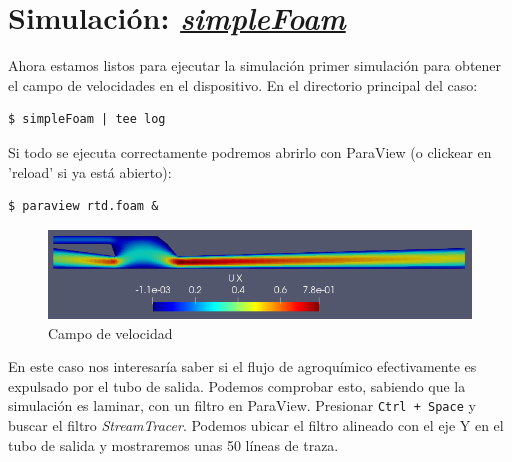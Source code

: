 \documentclass{article}
\begin{document}
%
%
%

\section{Simulación: \textit{\href{https://openfoamwiki.net/index.php/SimpleFoam}{simpleFoam}}}
Ahora estamos listos para ejecutar la simulación primer simulación para obtener el campo de velocidades en el dispositivo. En el directorio principal del caso:

\begin{lstlisting}
$ simpleFoam | tee log
\end{lstlisting}


Si todo se ejecuta correctamente podremos abrirlo con ParaView (o clickear en 'reload' si ya está abierto):
\begin{lstlisting}
$ paraview rtd.foam &
\end{lstlisting}

\begin{figure}[h!]
\centering
\includegraphics[width=1\textwidth]{Figuras/campo_vel.png}
\caption{Campo de velocidad}
\label{fig:campo_vel}
\end{figure}

En este caso nos interesaría saber si el flujo de agroquímico efectivamente es expulsado por el tubo de salida. Podemos comprobar esto, sabiendo que la simulación es laminar, con un filtro en ParaView. Presionar
\texttt{Ctrl + Space} y buscar el filtro \textit{StreamTracer}. Podemos ubicar el filtro alineado con el eje Y en el tubo de salida y mostraremos unas 50 líneas de traza.
\end{document}
